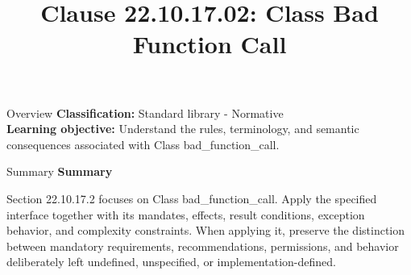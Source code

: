 \documentclass[10pt,letterpaper]{article}
\title{Clause 22.10.17.02: Class Bad Function Call}
\author{}
\date{}
\begin{document}
\maketitle
\begin{CornellOverviewBox}{Overview}
\textbf{Classification:} Standard library - Normative\\[2pt]
\textbf{Learning objective:} Understand the rules, terminology, and semantic consequences associated with Class bad\_function\_call.
\end{CornellOverviewBox}\begin{CornellSummaryBox}{Summary}
{\sffamily\bfseries\color{Accent} Summary}\par\vspace{3pt}Section 22.10.17.2 focuses on Class bad\_function\_call. Apply the specified interface together with its mandates, effects, result conditions, exception behavior, and complexity constraints. When applying it, preserve the distinction between mandatory requirements, recommendations, permissions, and behavior deliberately left undefined, unspecified, or implementation-defined.
\end{CornellSummaryBox}
\end{document}
